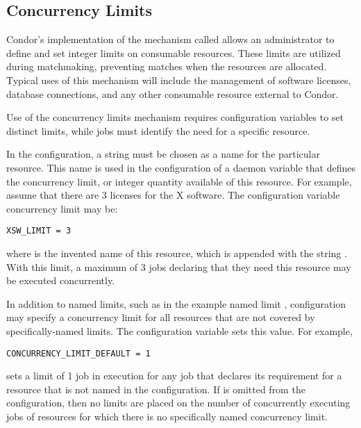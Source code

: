 \subsection{\label{sec:Concurrency-Limits}Concurrency Limits} 

Condor's implementation of the mechanism called 
allows an administrator to define and set integer limits on
consumable resources.
These limits are utilized during matchmaking, preventing matches when
the resources are allocated.
Typical uses of this mechanism will include
the management of software licenses, database connections,
and any other consumable resource external to Condor.

Use of the concurrency limits mechanism requires configuration variables
to set distinct limits,
while jobs must identify the need for a specific resource.

In the configuration, a string must be chosen as a name for the
particular resource.
This name is used in the configuration of a  daemon
variable that defines the concurrency limit, or integer quantity
available of this resource.
For example, assume that there are 3 licenses for the X software.
The configuration variable concurrency limit may be:
\begin{verbatim}
XSW_LIMIT = 3
\end{verbatim}
where  is the invented name of this resource,
which is appended with the string .
With this limit, a maximum of 3 jobs declaring that they need this
resource may be executed concurrently.

In addition to named limits, such as in the example named limit ,
configuration may specify a concurrency limit for all resources
that are not covered by specifically-named limits.
The configuration variable  sets
this value.  For example,
\begin{verbatim}
CONCURRENCY_LIMIT_DEFAULT = 1
\end{verbatim}
sets a limit of 1 job in execution for any job that declares its
requirement for a resource that is not named in the configuration.
If  is omitted  from the
configuration, then no limits are placed on the number of 
concurrently executing jobs of resources for which there is no
specifically named concurrency limit. 

